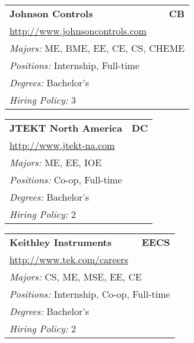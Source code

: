 \documentclass[twoside]{article}
\begin{document}
\begin{center}
\begin{multicols}{3}
\begin{FlushLeft}
\begin{minipage}{.9\columnwidth}
\end{minipage}
 
\begin{minipage}{.9\columnwidth}\begin{tabularx}{.95\columnwidth}{Xr}
                 {\Large\bf Johnson Controls} & {\Large\bf CB}\\
    \multicolumn{2}{p{.95\columnwidth}}{\url{http://www.johnsoncontrols.com}}\\
    \multicolumn{2}{p{.95\columnwidth}}{\emph{Majors:} ME, BME, EE, CE, CS, CHEME}\\
    \multicolumn{2}{p{.95\columnwidth}}{\emph{Positions:} Internship, Full-time}\\
    \multicolumn{2}{p{.95\columnwidth}}{\emph{Degrees:} Bachelor's}\\
    \multicolumn{2}{p{.95\columnwidth}}{\emph{Hiring Policy:} 3}\\
    \end{tabularx}
    
\end{minipage}
 
\begin{minipage}{.9\columnwidth}\begin{tabularx}{.95\columnwidth}{Xr}
                 {\Large\bf JTEKT North America} & {\Large\bf DC}\\
    \multicolumn{2}{p{.95\columnwidth}}{\url{http://www.jtekt-na.com}}\\
    \multicolumn{2}{p{.95\columnwidth}}{\emph{Majors:} ME, EE, IOE}\\
    \multicolumn{2}{p{.95\columnwidth}}{\emph{Positions:} Co-op, Full-time}\\
    \multicolumn{2}{p{.95\columnwidth}}{\emph{Degrees:} Bachelor's}\\
    \multicolumn{2}{p{.95\columnwidth}}{\emph{Hiring Policy:} 2}\\
    \end{tabularx}
    
\end{minipage}
 
\begin{minipage}{.9\columnwidth}\begin{tabularx}{.95\columnwidth}{Xr}
                 {\Large\bf Keithley Instruments} & {\Large\bf EECS}\\
    \multicolumn{2}{p{.95\columnwidth}}{\url{http://www.tek.com/careers}}\\
    \multicolumn{2}{p{.95\columnwidth}}{\emph{Majors:} CS, ME, MSE, EE, CE}\\
    \multicolumn{2}{p{.95\columnwidth}}{\emph{Positions:} Internship, Co-op, Full-time}\\
    \multicolumn{2}{p{.95\columnwidth}}{\emph{Degrees:} Bachelor's}\\
    \multicolumn{2}{p{.95\columnwidth}}{\emph{Hiring Policy:} 2}\\
    \end{tabularx}
    

\end{minipage}
\end{FlushLeft}
\end{multicols}
\end{center}
\end{document}
